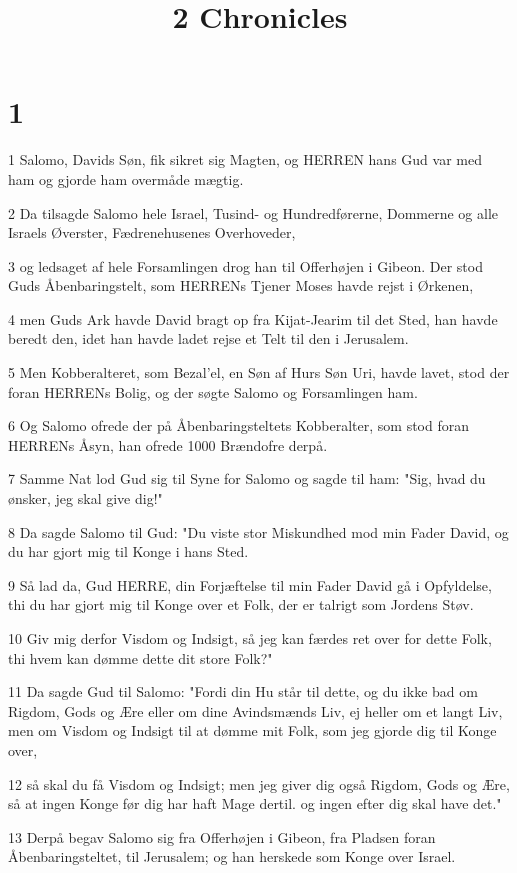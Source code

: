 

\title{2 Chronicles}


\chapter{1}

\par 1 Salomo, Davids Søn, fik sikret sig Magten, og HERREN hans Gud var med ham og gjorde ham overmåde mægtig.
\par 2 Da tilsagde Salomo hele Israel, Tusind- og Hundredførerne, Dommerne og alle Israels Øverster, Fædrenehusenes Overhoveder,
\par 3 og ledsaget af hele Forsamlingen drog han til Offerhøjen i Gibeon. Der stod Guds Åbenbaringstelt, som HERRENs Tjener Moses havde rejst i Ørkenen,
\par 4 men Guds Ark havde David bragt op fra Kijat-Jearim til det Sted, han havde beredt den, idet han havde ladet rejse et Telt til den i Jerusalem.
\par 5 Men Kobberalteret, som Bezal'el, en Søn af Hurs Søn Uri, havde lavet, stod der foran HERRENs Bolig, og der søgte Salomo og Forsamlingen ham.
\par 6 Og Salomo ofrede der på Åbenbaringsteltets Kobberalter, som stod foran HERRENs Åsyn, han ofrede 1000 Brændofre derpå.
\par 7 Samme Nat lod Gud sig til Syne for Salomo og sagde til ham: "Sig, hvad du ønsker, jeg skal give dig!"
\par 8 Da sagde Salomo til Gud: "Du viste stor Miskundhed mod min Fader David, og du har gjort mig til Konge i hans Sted.
\par 9 Så lad da, Gud HERRE, din Forjæftelse til min Fader David gå i Opfyldelse, thi du har gjort mig til Konge over et Folk, der er talrigt som Jordens Støv.
\par 10 Giv mig derfor Visdom og Indsigt, så jeg kan færdes ret over for dette Folk, thi hvem kan dømme dette dit store Folk?"
\par 11 Da sagde Gud til Salomo: "Fordi din Hu står til dette, og du ikke bad om Rigdom, Gods og Ære eller om dine Avindsmænds Liv, ej heller om et langt Liv, men om Visdom og Indsigt til at dømme mit Folk, som jeg gjorde dig til Konge over,
\par 12 så skal du få Visdom og Indsigt; men jeg giver dig også Rigdom, Gods og Ære, så at ingen Konge før dig har haft Mage dertil. og ingen efter dig skal have det."
\par 13 Derpå begav Salomo sig fra Offerhøjen i Gibeon, fra Pladsen foran Åbenbaringsteltet, til Jerusalem; og han herskede som Konge over Israel.
